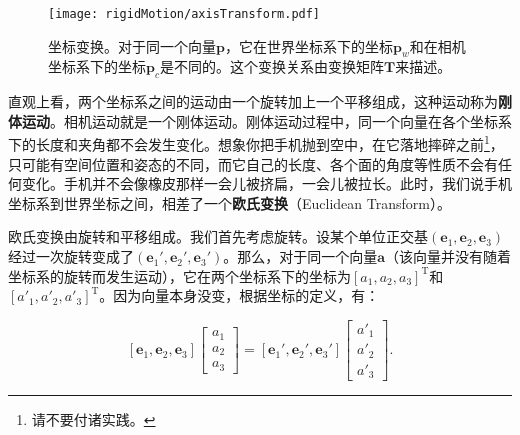 \begin{figure}[!htp]
	\centering
	\texttt{[image: rigidMotion/axisTransform.pdf]}
	\caption{坐标变换。对于同一个向量$\bm{p}$，它在世界坐标系下的坐标$\bm{p}_w$和在相机坐标系下的坐标$\bm{p}_c$是不同的。这个变换关系由变换矩阵$\bm{T}$来描述。}
	\label{fig:axisTransform}
\end{figure}

直观上看，两个坐标系之间的运动由一个旋转加上一个平移组成，这种运动称为\textbf{刚体运动}。相机运动就是一个刚体运动。刚体运动过程中，同一个向量在各个坐标系下的长度和夹角都不会发生变化。想象你把手机抛到空中，在它落地摔碎之前\footnote{请不要付诸实践。}，只可能有空间位置和姿态的不同，而它自己的长度、各个面的角度等性质不会有任何变化。手机并不会像橡皮那样一会儿被挤扁，一会儿被拉长。此时，我们说手机坐标系到世界坐标之间，相差了一个\textbf{欧氏变换}（Euclidean Transform）。

欧氏变换由旋转和平移组成。我们首先考虑旋转。设某个单位正交基$(\bm{e}_1,\bm{e}_2,\bm{e}_3)$经过一次旋转变成了$(\bm{e}_1', \bm{e}_2', \bm{e}_3')$。那么，对于同一个向量$\bm{a}$（该向量并没有随着坐标系的旋转而发生运动），它在两个坐标系下的坐标为$[a_1,a_2,a_3]^\mathrm{T}$和$[a'_1, a'_2, a'_3]^\mathrm{T}$。因为向量本身没变，根据坐标的定义，有：

\begin{equation}
\left[ \bm{e}_1,\bm{e}_2,\bm{e}_3 \right]\left[ \begin{array}{l}
{a_1}\\
{a_2}\\
{a_3}
\end{array} \right] = \left[ \bm{e}_1', \bm{e}_2', \bm{e}_3' \right]\left[ \begin{array}{l}
a'_1\\
a'_2\\
a'_3
\end{array} \right].
\end{equation}

